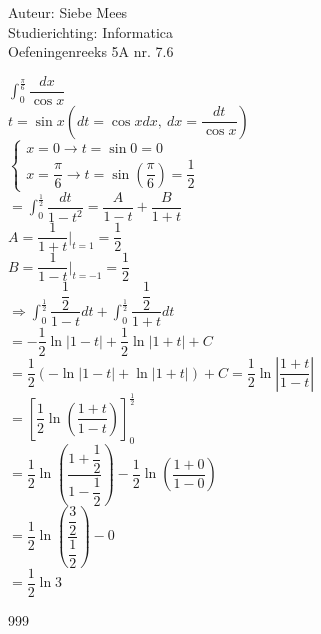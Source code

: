 \documentclass[a4paper]{article}
\begin{document}
  
\noindent \large Auteur: Siebe Mees \\
\noindent \large Studierichting: Informatica\\
\noindent \large Oefeningenreeks 5A nr. 7.6\\

\medskip

\normalsize

$ \displaystyle\int_0^{\tfrac{\pi}{6}} \dfrac{dx}{\cos x} $\\

$ t = \sin x \left(dt = \cos x dx,\ dx = \dfrac{dt}{\cos x}\right) $\\

$ \left \{
\begin{array}{l}
x = 0 \rightarrow t = \sin 0 = 0 \\

x = \dfrac{\pi}{6} \rightarrow t = \sin \left( \dfrac{\pi}{6} \right) = \dfrac{1}{2}
\end{array}
\right . $\\

$ = \displaystyle\int_0^{\tfrac{1}{2}} \dfrac{dt}{1-t^2} = \dfrac{A}{1-t} + \dfrac{B}{1+t} $\\

$ A = \dfrac{1}{1+t} \Big|_{t=1} = \dfrac{1}{2} $\\

$ B = \dfrac{1}{1-t} \Big|_{t=-1} = \dfrac{1}{2} $\\

$ \Rightarrow \displaystyle\int_0^{\tfrac{1}{2}} \dfrac{\dfrac{1}{2}}{1-t} dt + \displaystyle\int_0^{\tfrac{1}{2}} \dfrac{\dfrac{1}{2}}{1+t} dt $\\

$ = -\dfrac{1}{2} \ln |1-t| + \dfrac{1}{2} \ln |1+t| + C $\\

$ = \dfrac{1}{2} \left( -\ln |1-t| + \ln |1+t| \right) + C = \dfrac{1}{2} \ln \left| \dfrac{1+t}{1-t} \right| $\\

$ = \left[ \dfrac{1}{2} \ln \left( \dfrac{1+t}{1-t} \right) \right]_0^{\tfrac{1}{2}} $\\

$ = \dfrac{1}{2} \ln \left( \dfrac{1+\dfrac{1}{2}}{1-\dfrac{1}{2}} \right) - \dfrac{1}{2} \ln \left( \dfrac{1+0}{1-0} \right) $\\

$ = \dfrac{1}{2} \ln \left( \dfrac{\dfrac{3}{2}}{\dfrac{1}{2}} \right) - 0 $\\

$ = \dfrac{1}{2} \ln 3 $\\

\begin{thebibliography}{999}
\end{thebibliography}
\end{document}
